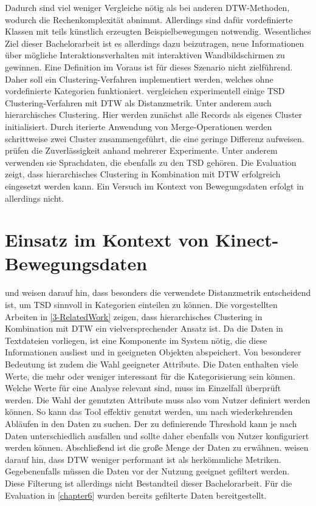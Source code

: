 Dadurch sind viel weniger Vergleiche nötig als bei anderen \ac{DTW}-Methoden,
wodurch die Rechenkomplexität abnimmt.
Allerdings sind dafür vordefinierte Klassen mit teils künstlich erzeugten Beispielbewegungen notwendig.
Wesentliches Ziel dieser Bachelorarbeit ist es allerdings dazu beizutragen, neue Informationen
über mögliche Interaktionsverhalten mit interaktiven Wandbildschirmen zu gewinnen.
Eine Definition im Voraus ist für dieses Szenario nicht zielführend.
Daher soll ein Clustering-Verfahren implementiert werden,
welches ohne vordefinierte Kategorien funktioniert.
\citet{hautamaki_time-series_2008} vergleichen experimentell einige \ac{TSD} Clustering-Verfahren
mit \ac{DTW} als Distanzmetrik.
Unter anderem auch hierarchisches Clustering.
Hier werden zunächst alle Records als eigenes Cluster initialisiert.
Durch iterierte Anwendung von Merge-Operationen werden schrittweise zwei Cluster zusammengeführt,
die eine geringe Differenz aufweisen.
\citet{hautamaki_time-series_2008} prüfen die Zuverlässigkeit anhand mehrerer Experimente.
Unter anderem verwenden sie Sprachdaten, die ebenfalls zu den \ac{TSD} gehören.
Die Evaluation zeigt, dass hierarchisches Clustering in Kombination mit \ac{DTW} erfolgreich eingesetzt werden kann.
Ein Versuch im Kontext von Bewegungsdaten erfolgt in \citet{hautamaki_time-series_2008} allerdings nicht.

\section{Einsatz im Kontext von Kinect-Bewegungsdaten}
\label{3-Einsatz}
\citet{warren_liao_clustering_2005} und \citet{aghabozorgi_time-series_2015} weisen darauf hin,
dass besonders die verwendete Distanzmetrik entscheidend ist,
um \ac{TSD} sinnvoll in Kategorien einteilen zu können.
Die vorgestellten Arbeiten in \autoref{3-RelatedWork} zeigen,
dass hierarchisches Clustering in Kombination mit \ac{DTW} ein vielversprechender Ansatz ist.
Da die Daten in Textdateien vorliegen, ist eine Komponente im System nötig,
die diese Informationen ausliest und in geeigneten Objekten abspeichert.
Von besonderer Bedeutung ist zudem die Wahl geeigneter Attribute.
Die Daten enthalten viele Werte, die mehr oder weniger interessant für die Kategorisierung sein können.
Welche Werte für eine Analyse relevant sind, muss im Einzelfall überprüft werden.
Die Wahl der genutzten Attribute muss also vom Nutzer definiert werden können.
So kann das Tool effektiv genutzt werden, um nach wiederkehrenden Abläufen in den Daten zu suchen.
Der zu definierende Threshold kann je nach Daten unterschiedlich ausfallen
und sollte daher ebenfalls von Nutzer konfiguriert werden können.
Abschließend ist die große Menge der Daten zu erwähnen.
\citet{aghabozorgi_time-series_2015} weisen darauf hin,
dass \ac{DTW} weniger performant ist als herkömmliche Metriken.
Gegebenenfalls müssen die Daten vor der Nutzung geeignet gefiltert werden.
Diese Filterung ist allerdings nicht Bestandteil dieser Bachelorarbeit.
Für die Evaluation in \autoref{chapter6} wurden bereits gefilterte Daten bereitgestellt.